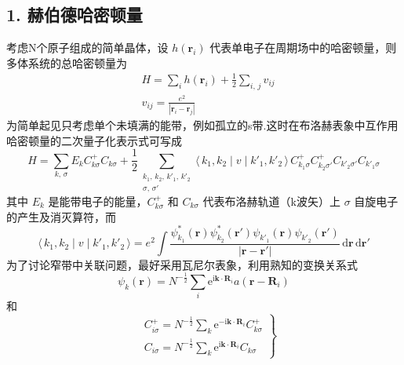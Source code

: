 \subsection*{1. 赫伯德哈密顿量}

考虑N个原子组成的简单晶体，设 $h(\boldsymbol{r}_{i})$ 代表单电子在周期场中的哈密顿量，则多体系统的总哈密顿量为
\begin{equation}
\begin{aligned}
  &H=\sum_{i}h(\boldsymbol{r}_{i})
  +\frac{1}{2}\sum_{i,\,j}v_{ij}\\
  &v_{ij}=\frac{e^{2}}{|\boldsymbol{r}_{i}-\boldsymbol{r}_{j}|}
\end{aligned}
\end{equation}
为简单起见只考虑单个未填满的能带，例如孤立的s带.这时在布洛赫表象中互作用哈密顿量的二次量子化表示式可写成
\begin{equation}
  H=\sum_{k,\,\sigma}E_{k}C^{+}_{k\sigma}C_{k\sigma}
  +\frac{1}{2}\sum_{\substack{k_{1},\,k_{2},\,k'_{1},\,k'_{2}\\ \sigma,\,\sigma'}}
  \langle\,k_{1},k_{2}\mid v\mid k'_{1},k'_{2}\,\rangle\,
  C^{+}_{k_{1}\sigma}C^{+}_{k_{2}\sigma'}C_{k'_{2}\sigma'}C_{k'_{1}\sigma}
\end{equation}
其中 $E_{k}$ 是能带电子的能量，$C^{+}_{k\sigma}$ 和 $C_{k\sigma}$ 代表布洛赫轨道（k波矢）上 $\sigma$ 自旋电子的产生及消灭算符，而
\begin{equation}
  \langle\,k_{1},k_{2}\mid v\mid k'_{1},k'_{2}\,\rangle
  =e^{2}\int\frac{\psi^{*}_{k_{1}}(\boldsymbol{r})\psi^{*}_{k_{2}}(\boldsymbol{r}')
  \psi_{k'_{1}}(\boldsymbol{r})\psi_{k'_{2}}(\boldsymbol{r}')}
  {|\boldsymbol{r}-\boldsymbol{r}'|}\,\mathrm{d}\boldsymbol{r}\,\mathrm{d}\boldsymbol{r}'
\end{equation}
为了讨论窄带中关联问题，最好采用瓦尼尔表象，利用熟知的变换关系式
\begin{equation}
  \psi_{k}(\boldsymbol{r})=N^{-\frac{1}{2}}\sum_{i}
  \mathrm{e}^{\mathrm{i}\boldsymbol{k}\cdot\boldsymbol{R}_{i}}
  a(\boldsymbol{r}-\boldsymbol{R}_{i})
\end{equation}
和
\begin{equation}
\left.
\begin{aligned}
  &C^{+}_{i\sigma}=N^{-\frac{1}{2}}\sum_{k}
  \mathrm{e}^{-\mathrm{i}\boldsymbol{k}\cdot\boldsymbol{R}_{i}}C^{+}_{k\sigma}\\
  &C_{i\sigma}=N^{-\frac{1}{2}}\sum_{k}
  \mathrm{e}^{\mathrm{i}\boldsymbol{k}\cdot\boldsymbol{R}_{i}}C_{k\sigma}
\end{aligned}\right\}
\end{equation}
